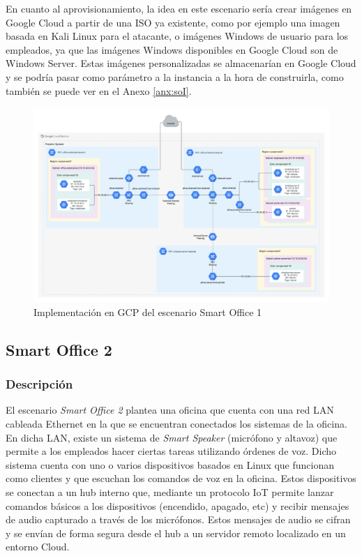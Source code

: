   En cuanto al aprovisionamiento, la idea en este escenario sería crear imágenes en Google Cloud a partir de una ISO ya existente, como por ejemplo una imagen basada en Kali Linux para el atacante, o imágenes Windows de usuario para los empleados, ya que las imágenes Windows disponibles en Google Cloud son de Windows Server. Estas imágenes personalizadas se almacenarían en Google Cloud y se podría pasar como parámetro a la instancia a la hora de construirla, como también se puede ver en el Anexo \ref{anx:soI}.

  \clearpage
  \begin{figure}[h]
  \centering
  \includegraphics[width=1.45\textwidth, angle=270]{../imgs/desarrollo/escenarios-de-red/smart-office-1/EscenarioSmartOffice1V2.png}
  \caption{Implementación en GCP del escenario Smart Office 1}
  \label{fig:so1-i}
  \end{figure}
  \clearpage 

\subsection{Smart Office 2} \label{sec:so2}
\subsubsection{Descripción}
  El escenario \textit{Smart Office 2} plantea una oficina que cuenta con una red LAN cableada Ethernet en la que se encuentran conectados los sistemas de la oficina. En dicha LAN, existe un sistema de \textit{Smart Speaker} (micrófono y altavoz) que permite a los empleados hacer ciertas tareas utilizando órdenes de voz. Dicho sistema cuenta con uno o varios dispositivos basados en Linux que funcionan como clientes y que escuchan los comandos de voz en la oficina. Estos dispositivos se conectan a un hub interno que, mediante un protocolo IoT permite lanzar comandos básicos a los dispositivos (encendido, apagado, etc) y recibir mensajes de audio capturado a través de los micrófonos. Estos mensajes de audio se cifran y se envían de forma segura desde el hub a un servidor remoto localizado en un entorno Cloud.

